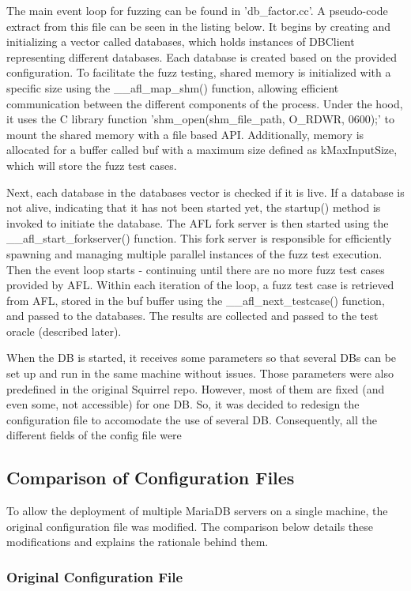 \documentclass[sigconf]{acmart}
\begin{document}
The main event loop for fuzzing can be found in 'db\_factor.cc'. A pseudo-code extract from this file can be seen in the listing below. It begins by creating and initializing a vector called databases, which holds instances of DBClient representing different databases. Each database is created based on the provided configuration. To facilitate the fuzz testing, shared memory is initialized with a specific size using the \_\_afl\_map\_shm() function, allowing efficient communication between the different components of the process. Under the hood, it uses the C library function 'shm\_open(shm\_file\_path, O\_RDWR, 0600);' to mount the shared memory with a file based API. Additionally, memory is allocated for a buffer called buf with a maximum size defined as kMaxInputSize, which will store the fuzz test cases.

Next, each database in the databases vector is checked if it is live. If a database is not alive, indicating that it has not been started yet, the startup() method is invoked to initiate the database. The AFL fork server is then started using the \_\_afl\_start\_forkserver() function. This fork server is responsible for efficiently spawning and managing multiple parallel instances of the fuzz test execution. Then the event loop starts - continuing until there are no more fuzz test cases provided by AFL. Within each iteration of the loop, a fuzz test case is retrieved from AFL, stored in the buf buffer using the \_\_afl\_next\_testcase() function, and passed to the databases. The results are collected and passed to the test oracle (described later).

When the DB is started, it receives some parameters so that several DBs can be set up and run in the same machine without issues. Those parameters were also predefined in the original Squirrel repo. However, most of them are fixed (and even some, not accessible) for one DB. So, it was decided to redesign the configuration file to accomodate the use of several DB. Consequently, all the different fields of the config file were 
\subsection{Comparison of Configuration Files}

To allow the deployment of multiple MariaDB servers on a single machine, the original configuration file was modified. The comparison below details these modifications and explains the rationale behind them.

\subsubsection{Original Configuration File}
\end{document}
